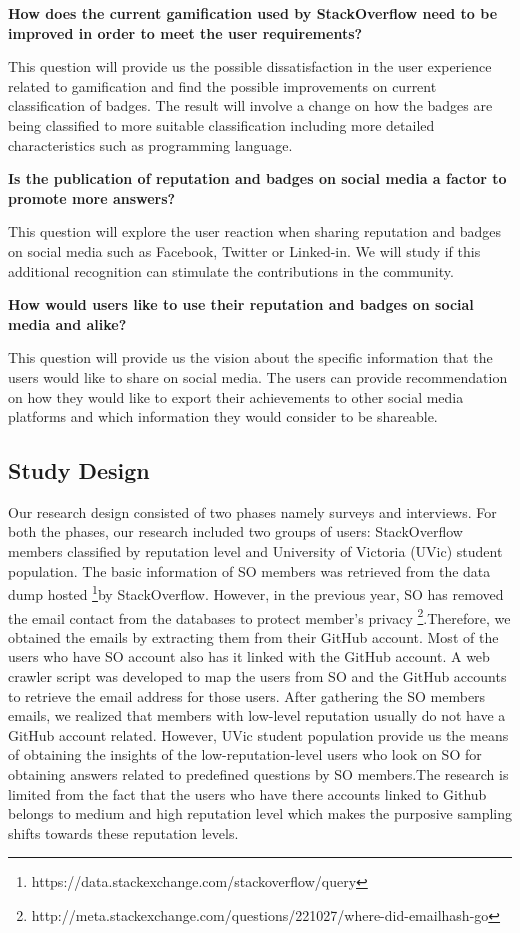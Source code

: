 \documentclass{sigchi}
\begin{document}
\textbf{How does the current gamification used by StackOverflow need to be improved in order to meet the user requirements?}

This question will provide us the possible dissatisfaction in the user experience related to gamification and find the possible improvements on current classification of badges. The result will involve a change on how the badges are being classified to more suitable classification including more detailed characteristics such as programming language.

\textbf{Is the publication of reputation and badges on social media a
factor to promote more answers?}

This question will explore the user reaction when sharing reputation and badges on social media such as Facebook, Twitter or Linked-in. We will study if this additional recognition can stimulate the contributions in the community.

\textbf{How would users like to use their reputation and badges
on social media and alike?}

This question will provide us the vision about the specific information that the users would like to share on social media. The users can provide recommendation on how they would like to export their achievements to other social media platforms and which information they would consider to be shareable.

\subsection{Study Design}
Our research design consisted of two phases namely surveys and interviews. For both the phases, our research included two groups of users: StackOverflow members classified by reputation level and University of Victoria (UVic) student population. The basic information of SO members was retrieved from the data dump hosted \footnote{https://data.stackexchange.com/stackoverflow/query}by StackOverflow. However, in the previous year, SO has removed the email contact from the databases to protect member's privacy \footnote{http://meta.stackexchange.com/questions/221027/where-did-emailhash-go}.Therefore, we obtained the emails by extracting them from their GitHub account. Most of the users who have SO account also has it linked with the GitHub account. A web crawler script was developed to map the users from SO and the GitHub accounts to retrieve the email address for those users. After gathering the SO members emails, we realized that members with low-level reputation usually do not have a GitHub account related. However, UVic student population provide us the means of obtaining the insights of the low-reputation-level users who look on SO for obtaining answers related to predefined questions by SO members.The research is limited from the fact that the users who have there accounts linked to Github belongs to medium and high reputation level which makes the purposive sampling shifts towards these reputation levels.
\end{document}
